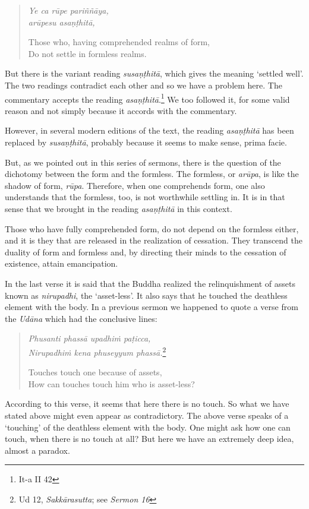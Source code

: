 \begin{quote}
\emph{Ye ca rūpe pariññāya,}\\
\emph{arūpesu asaṇṭhitā,}

Those who, having comprehended realms of form,\\
Do not settle in formless realms.
\end{quote}

But there is the variant reading \emph{susaṇṭhitā}, which gives the meaning `settled well'. The two readings contradict each other and so we have a problem here. The commentary accepts the reading \emph{asaṇṭhitā}.\footnote{It-a II 42} We too followed it, for some valid reason and not simply because it accords with the commentary.

However, in several modern editions of the text, the reading \emph{asaṇṭhitā} has been replaced by \emph{susaṇṭhitā}, probably because it seems to make sense, prima facie.

But, as we pointed out in this series of sermons, there is the question of the dichotomy between the form and the formless. The formless, or \emph{arūpa}, is like the shadow of form, \emph{rūpa}. Therefore, when one comprehends form, one also understands that the formless, too, is not worthwhile settling in. It is in that sense that we brought in the reading \emph{asaṇṭhitā} in this context.

Those who have fully comprehended form, do not depend on the formless either, and it is they that are released in the realization of cessation. They transcend the duality of form and formless and, by directing their minds to the cessation of existence, attain emancipation.

In the last verse it is said that the Buddha realized the relinquishment of assets known as \emph{nirupadhi}, the `asset-less'. It also says that he touched the deathless element with the body. In a previous sermon we happened to quote a verse from the \emph{Udāna} which had the conclusive lines:

\begin{quote}
\emph{Phusanti phassā upadhiṁ paṭicca,}\\
\emph{Nirupadhiṁ kena phuseyyum phassā.}\footnote{Ud 12, \emph{Sakkārasutta}; see \emph{Sermon 16}}

Touches touch one because of assets,\\
How can touches touch him who is asset-less?
\end{quote}

According to this verse, it seems that here there is no touch. So what we have stated above might even appear as contradictory. The above verse speaks of a `touching' of the deathless element with the body. One might ask how one can touch, when there is no touch at all? But here we have an extremely deep idea, almost a paradox.

